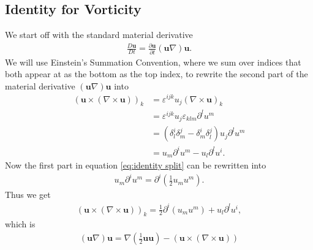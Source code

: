 \subsection{Identity for Vorticity}
We start off with the standard material derivative
\begin{align}
    \frac{D\mathbf{u}}{Dt} = \frac{\partial \mathbf{u}}{\partial t}
    (\mathbf{u}\nabla)\mathbf{u}.
\end{align}
We will use Einstein's Summation Convention, where we sum over indices that
both appear at as the bottom as the top index, to rewrite the second part of
the material derivative $(\mathbf{u}\nabla)\mathbf{u}$ into
\begin{align}
    (\mathbf{u}\times (\nabla \times \mathbf{u}))_k
    &= \varepsilon^{ijk}u_j(\nabla \times  \mathbf{u})_k \\
    &= \varepsilon^{ijk}u_j\varepsilon_{klm}\partial^l u^m\\
    &=(\delta^i_l\delta^j_m-\delta^i_m\delta^j_l)u_j\partial^l u^m\\
    &=u_m\partial^i u^m - u_l \partial^l u^i.\label{eq:identity split}
\end{align}
Now the first part in equation \ref{eq:identity split} can be rewritten into
\begin{align}
    u_m\partial^i u^m =\partial^i (\frac{1}{2}u_mu^m) .
\end{align}
Thus we get
\begin{align}
    (\mathbf{u}\times (\nabla \times \mathbf{u}))_k
    = \frac{1}{2}\partial^i(u_m u^m) + u_l \partial^l u^i,
\end{align}
which is
\begin{align}
    (\mathbf{u}\nabla)\mathbf{u} = \nabla(\frac{1}{2}\mathbf{u}\mathbf{u}) -
    \left(\mathbf{u}\times (\nabla \times  \mathbf{u})\right)
\end{align}

